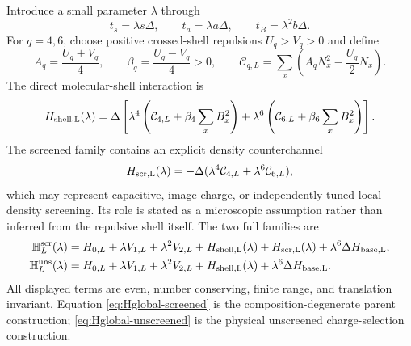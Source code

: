 \documentclass[11pt]{article}
\theoremstyle{definition}
\theoremstyle{remark}
\newcommand{\cC}{\mathcal C}
\begin{document}
Introduce a small parameter $\lambda$ through
\begin{equation}
 t_s=\lambda s\Delta,
 \qquad t_a=\lambda a\Delta,
 \qquad t_B=\lambda^2b\Delta.
 \label{eq:hierarchy}
\end{equation}
For $q=4,6$, choose positive crossed-shell repulsions $U_q>V_q>0$ and define
\begin{equation}
 A_q=\frac{U_q+V_q}{4},
 \qquad
 \beta_q=\frac{U_q-V_q}{4}>0,
 \qquad
 \cC_{q,L}=\sum_x\left(A_qN_x^2-\frac{U_q}{2}N_x\right).
 \label{eq:shell-coefficients}
\end{equation}
The direct molecular-shell interaction is
\begin{equation}
 H_{\rm shell,L}(\lambda)=\Delta\left[
 \lambda^4\left(\cC_{4,L}+\beta_4\sum_xB_x^2\right)
 +\lambda^6\left(\cC_{6,L}+\beta_6\sum_xB_x^2\right)
 \right].
 \label{eq:Hshell}
\end{equation}
The screened family contains an explicit density counterchannel
\begin{equation}
 H_{\rm scr,L}(\lambda)=-\Delta(\lambda^4\cC_{4,L}+\lambda^6\cC_{6,L}),
 \label{eq:Hscreen}
\end{equation}
which may represent capacitive, image-charge, or independently tuned local density screening.  Its role is stated as a microscopic assumption rather than inferred from the repulsive shell itself.  The two full families are
\begin{align}
 \mathbb H_L^{\rm scr}(\lambda)={}&H_{0,L}+\lambda V_{1,L}+\lambda^2V_{2,L}
 +H_{\rm shell,L}(\lambda)+H_{\rm scr,L}(\lambda)
 +\lambda^6\Delta H_{\rm base,L},
 \label{eq:Hglobal-screened}\\
 \mathbb H_L^{\rm uns}(\lambda)={}&H_{0,L}+\lambda V_{1,L}+\lambda^2V_{2,L}
 +H_{\rm shell,L}(\lambda)+\lambda^6\Delta H_{\rm base,L}.
 \label{eq:Hglobal-unscreened}
\end{align}
All displayed terms are even, number conserving, finite range, and translation invariant.  Equation \eqref{eq:Hglobal-screened} is the composition-degenerate parent construction; \eqref{eq:Hglobal-unscreened} is the physical unscreened charge-selection construction.
\end{document}
